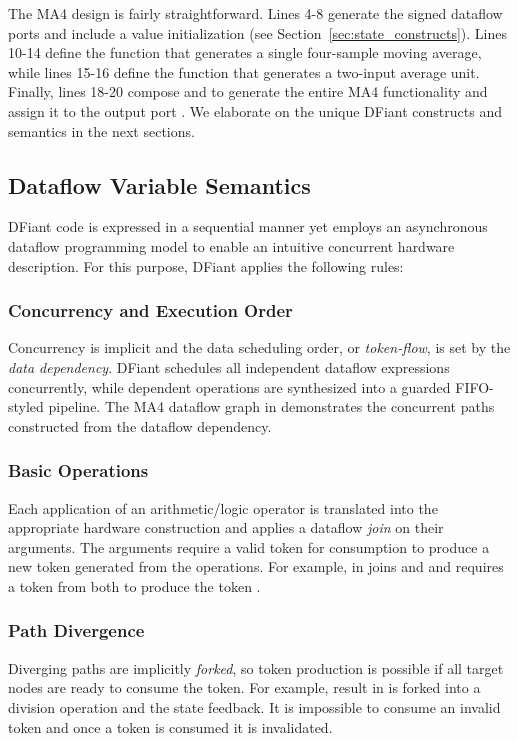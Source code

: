 The MA4 design is fairly straightforward. Lines 4-8 generate the signed dataflow ports and include a  value initialization (see Section~\ref{sec:state_constructs}). 
Lines 10-14 define the function  that generates a single four-sample moving average, while lines 15-16 define the function  that generates a two-input average unit. Finally, lines 18-20 compose  and  to generate the entire MA4 functionality and assign it to the output port . We elaborate on the unique DFiant constructs and semantics in the next sections.


\subsection{Dataflow Variable Semantics}
DFiant code is expressed in a sequential manner yet employs an asynchronous dataflow programming model to enable an intuitive concurrent hardware description. For this purpose, DFiant applies the following rules:

\subsubsection{Concurrency and Execution Order} 
Concurrency is implicit and the data scheduling order, or \textit{token-flow}, is set by the \textit{data dependency}. DFiant schedules all independent dataflow expressions concurrently, while dependent operations are synthesized into a guarded FIFO-styled pipeline. The MA4 dataflow graph in  demonstrates the concurrent paths constructed from the dataflow dependency. 

\subsubsection{Basic Operations} 
\label{sec:basic_ops}
Each application of an arithmetic/logic operator is translated into the appropriate hardware construction and applies a dataflow \emph{join} on their arguments. The arguments require a valid token for consumption to produce a new token generated from the operations. For example, \code{+} in  joins  and  and requires a token from both to produce the token .

\subsubsection{Path Divergence} 
\label{sec:path_div}
Diverging paths are implicitly \emph{forked}, so token production is possible if all target nodes are ready to consume the token. For example,  result in  is forked into a division operation and the state feedback.	It is impossible to consume an invalid token and once a token is consumed it is invalidated.

